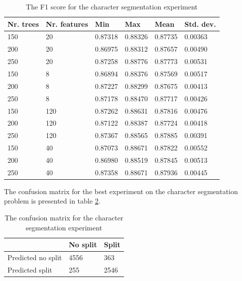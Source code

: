 \begin{table}[h]
\caption{The F1 score for the character segmentation experiment}
\label{table:seg_values}
\begin{tabular}{llllll}
\toprule
Nr. trees & Nr. features & Min     & Max     & Mean    & Std. dev. \\ 
\midrule
150 & 20 & 0.87318 & 0.88326 & 0.87735 & 0.00363 \\ 
200 & 20 & 0.86975 & 0.88312 & 0.87657 & 0.00490 \\ 
250 & 20 & 0.87258 & 0.88776 & 0.87773 & 0.00531 \\ 
150 & 8 & 0.86894 & 0.88376 & 0.87569 & 0.00517 \\ 
200 & 8 & 0.87227 & 0.88299 & 0.87675 & 0.00413 \\ 
250 & 8 & 0.87178 & 0.88470 & 0.87717 & 0.00426 \\ 
150 & 120 & 0.87262 & 0.88631 & 0.87816 & 0.00476 \\ 
200 & 120 & 0.87122 & 0.88387 & 0.87724 & 0.00418 \\ 
250 & 120 & 0.87367 & 0.88565 & 0.87885 & 0.00391 \\ 
150 & 40 & 0.87073 & 0.88671 & 0.87822 & 0.00552 \\ 
200 & 40 & 0.86980 & 0.88519 & 0.87845 & 0.00513 \\ 
250 & 40 & 0.87358 & 0.88671 & 0.87936 & 0.00445 \\ 
\bottomrule
\end{tabular}
\end{table}

The confusion matrix for the best experiment on the character segmentation problem is presented in table \ref{table:seg_conf}.

\begin{table}[h]
\caption{The confusion matrix for the character segmentation experiment}
\label{table:seg_conf}
\begin{tabular}{lll}
\hline
 & No split & Split \\ \hline
Predicted no split & 4556 & 363 \\ 
Predicted split & 255 & 2546 \\  \hline
\end{tabular}
\end{table}

